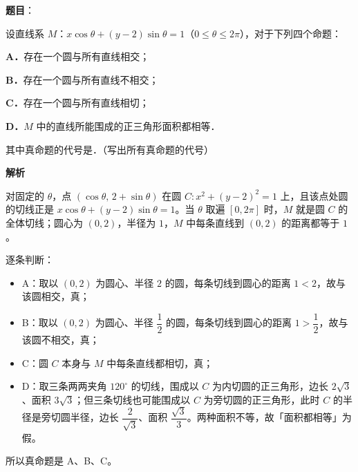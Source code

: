 \begin{answer}

\textbf{题目}：

设直线系 $M$：$x\cos\theta+(y-2)\sin\theta=1$（$0\leqslant\theta\leqslant2\pi$），对于下列四个命题：

\textbf{A．}存在一个圆与所有直线相交；

\textbf{B．}存在一个圆与所有直线不相交；

\textbf{C．}存在一个圆与所有直线相切；

\textbf{D．}$M$ 中的直线所能围成的正三角形面积都相等．

其中真命题的代号是\gkblank{}．（写出所有真命题的代号）

\textbf{解析}

对固定的 $\theta$，点 $(\cos\theta,\,2+\sin\theta)$ 在圆 $C:x^2+(y-2)^2=1$ 上，且该点处圆的切线正是 $x\cos\theta+(y-2)\sin\theta=1$。当 $\theta$ 取遍 $[0,2\pi]$ 时，$M$ 就是圆 $C$ 的全体切线；圆心为 $(0,2)$，半径为 $1$，$M$ 中每条直线到 $(0,2)$ 的距离都等于 $1$。

逐条判断：

\begin{itemize}
\item A：取以 $(0,2)$ 为圆心、半径 $2$ 的圆，每条切线到圆心的距离 $1<2$，故与该圆相交，真；
\item B：取以 $(0,2)$ 为圆心、半径 $\dfrac12$ 的圆，每条切线到圆心的距离 $1>\dfrac12$，故与该圆不相交，真；
\item C：圆 $C$ 本身与 $M$ 中每条直线都相切，真；
\item D：取三条两两夹角 $120^\circ$ 的切线，围成以 $C$ 为内切圆的正三角形，边长 $2\sqrt3$、面积 $3\sqrt3$；但三条切线也可能围成以 $C$ 为旁切圆的正三角形，此时 $C$ 的半径是旁切圆半径，边长 $\dfrac{2}{\sqrt3}$、面积 $\dfrac{\sqrt3}{3}$。两种面积不等，故「面积都相等」为假。
\end{itemize}

所以真命题是 A、B、C。


\end{answer}
